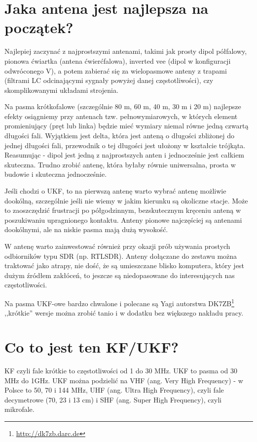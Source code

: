 \documentclass[a4paper,12pt]{article}
\begin{document}
\section{Jaka antena jest najlepsza na początek?}
Najlepiej zaczynać z najprostszymi antenami, takimi jak prosty dipol półfalowy, pionowa ćwiartka (antena ćwierćfalowa), inverted vee (dipol w konfiguracji odwróconego V), a potem zabierać się za wielopasmowe anteny z trapami (filtrami LC odcinającymi sygnały powyżej danej częstotliwości), czy skomplikowanymi układami strojenia.

Na pasma krótkofalowe (szczególnie 80 m, 60 m, 40 m, 30 m i 20 m) najlepsze efekty osiągniemy przy antenach tzw. pełnowymiarowych, w których element promieniujący (pręt lub linka) będzie mieć wymiary niemal równe jedną czwartą długości fali. Wyjątkiem jest delta, która jest anteną o długości zbliżonej do jednej długości fali, przewodnik o tej długości jest ułożony w kształcie trójkąta. Reasumując - dipol jest jedną z najprostszych anten i jednocześnie jest całkiem skuteczna. Trudno zrobić antenę, która byłaby równie uniwersalna, prosta w budowie i skuteczna jednocześnie.

Jeśli chodzi o UKF, to na pierwszą antenę warto wybrać antenę możliwie dookólną, szczególnie jeśli nie wiemy w jakim kierunku są okoliczne stacje. Może to zaoszczędzić frustracji po półgodzinnym, bezskutecznym kręceniu anteną w poszukiwaniu upragnionego kontaktu. Anteny pionowe najczęściej są antenami dookólnymi, ale na niskie pasma mają dużą wysokość.

W antenę warto zainwestować również przy okazji prób używania prostych odbiorników typu SDR (np. RTLSDR). Anteny dołączane do zestawu można traktować jako atrapy, nie dość, że są umieszczane blisko komputera, który jest dużym źródłem zakłóceń, to jeszcze są niedopasowane do interesujących nas częstotliwości.

Na pasma UKF-owe bardzo chwalone i polecane są Yagi autorstwa DK7ZB\footnote{\url{http://dk7zb.darc.de}} ,,krótkie'' wersje można zrobić tanio i w dodatku bez większego nakładu pracy.

\section{Co to jest ten KF/UKF?}
KF czyli fale krótkie to częstotliwości od 1 do 30 MHz.
UKF to pasma od 30 MHz do 1GHz. 
UKF można podzielić na VHF (ang. Very High Frequency) - w Polsce to 50, 70 i 144 MHz, UHF (ang. Ultra High Frequency), czyli fale decymetrowe (70, 23 i 13 cm) i SHF (ang. Super High Frequency), czyli mikrofale.
\end{document}
